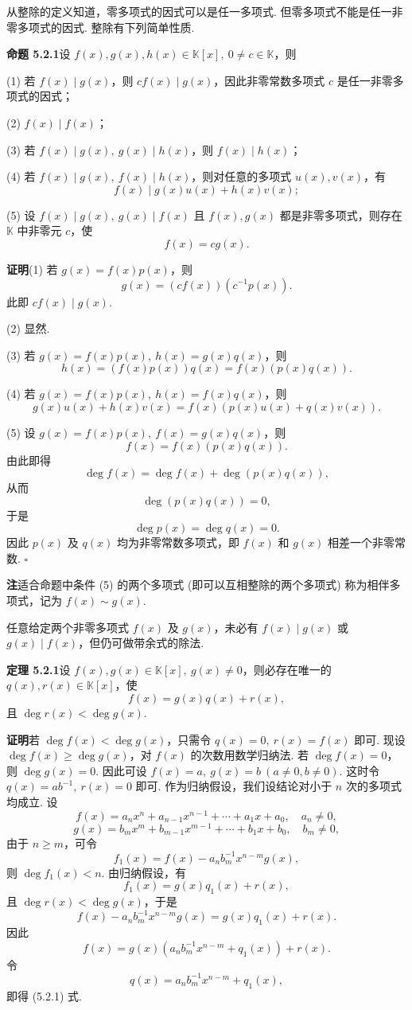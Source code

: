 \documentclass[UTF8, 12pt, fontset=fandol, oneside]{ctexart}
\begin{document}
从整除的定义知道，零多项式的因式可以是任一多项式. 但零多项式不能是任一非零多项式的因式. 整除有下列简单性质.

\noindent\textbf{命题 5.2.1}\quad 设 $f(x),g(x),h(x)\in\mathbb{K}[x],\ 0\neq c\in\mathbb{K}$，则

(1) 若 $f(x)\mid g(x)$，则 $cf(x)\mid g(x)$，因此非零常数多项式 $c$ 是任一非零多项式的因式；

(2) $f(x)\mid f(x)$；

(3) 若 $f(x)\mid g(x),\ g(x)\mid h(x)$，则 $f(x)\mid h(x)$；

(4) 若 $f(x)\mid g(x),\ f(x)\mid h(x)$，则对任意的多项式 $u(x),v(x)$，有
\[
f(x)\mid g(x)u(x)+h(x)v(x);
\]

(5) 设 $f(x)\mid g(x),\ g(x)\mid f(x)$ 且 $f(x),g(x)$ 都是非零多项式，则存在 $\mathbb{K}$ 中非零元 $c$，使
\[
f(x)=cg(x).
\]

\noindent\textbf{证明}\quad (1) 若 $g(x)=f(x)p(x)$，则
\[
g(x)=(cf(x))(c^{-1}p(x)).
\]
此即 $cf(x)\mid g(x)$.

(2) 显然.

(3) 若 $g(x)=f(x)p(x),\ h(x)=g(x)q(x)$，则
\[
h(x)=(f(x)p(x))q(x)=f(x)(p(x)q(x)).
\]

(4) 若 $g(x)=f(x)p(x),\ h(x)=f(x)q(x)$，则
\[
g(x)u(x)+h(x)v(x)=f(x)(p(x)u(x)+q(x)v(x)).
\]

(5) 设 $g(x)=f(x)p(x),\ f(x)=g(x)q(x)$，则
\[
f(x)=f(x)(p(x)q(x)).
\]
由此即得
\[
\deg f(x)=\deg f(x)+\deg(p(x)q(x)),
\]
从而
\[
\deg(p(x)q(x))=0,
\]
于是
\[
\deg p(x)=\deg q(x)=0.
\]
因此 $p(x)$ 及 $q(x)$ 均为非零常数多项式，即 $f(x)$ 和 $g(x)$ 相差一个非零常数. $\square$

\noindent\textbf{注}\quad 适合命题中条件 (5) 的两个多项式 (即可以互相整除的两个多项式) 称为相伴多项式，记为 $f(x)\sim g(x)$.

任意给定两个非零多项式 $f(x)$ 及 $g(x)$，未必有 $f(x)\mid g(x)$ 或 $g(x)\mid f(x)$，但仍可做带余式的除法.

\noindent\textbf{定理 5.2.1}\quad 设 $f(x),g(x)\in\mathbb{K}[x],\ g(x)\neq 0$，则必存在唯一的 $q(x),r(x)\in\mathbb{K}[x]$，使
\begin{equation}
f(x)=g(x)q(x)+r(x),
\tag{5.2.1}
\end{equation}
且 $\deg r(x)<\deg g(x)$.

\noindent\textbf{证明}\quad 若 $\deg f(x)<\deg g(x)$，只需令 $q(x)=0,\ r(x)=f(x)$ 即可.
现设 $\deg f(x)\geq \deg g(x)$，对 $f(x)$ 的次数用数学归纳法. 若 $\deg f(x)=0$，则 $\deg g(x)=0$. 因此可设 $f(x)=a,\ g(x)=b\ (a\neq 0,b\neq 0)$. 这时令 $q(x)=ab^{-1},\ r(x)=0$ 即可. 作为归纳假设，我们设结论对小于 $n$ 次的多项式均成立. 设
\[
f(x)=a_nx^n+a_{n-1}x^{n-1}+\cdots+a_1x+a_0,\quad a_n\neq 0,
\]
\[
g(x)=b_mx^m+b_{m-1}x^{m-1}+\cdots+b_1x+b_0,\quad b_m\neq 0,
\]
由于 $n\geq m$，可令
\[
f_1(x)=f(x)-a_nb_m^{-1}x^{n-m}g(x),
\]
则 $\deg f_1(x)<n$. 由归纳假设，有
\[
f_1(x)=g(x)q_1(x)+r(x),
\]
且 $\deg r(x)<\deg g(x)$，于是
\[
f(x)-a_nb_m^{-1}x^{n-m}g(x)=g(x)q_1(x)+r(x).
\]
因此
\[
f(x)=g(x)(a_nb_m^{-1}x^{n-m}+q_1(x))+r(x).
\]
令
\[
q(x)=a_nb_m^{-1}x^{n-m}+q_1(x),
\]
即得 (5.2.1) 式.
\end{document}

